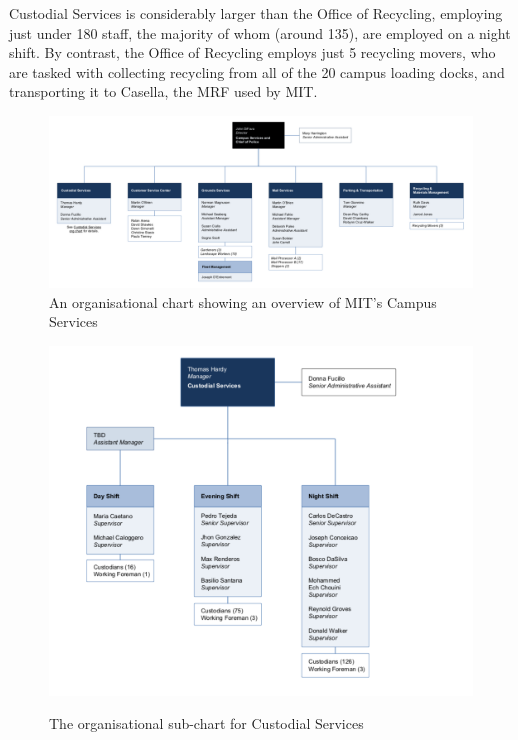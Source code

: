 \documentclass[nofonts,nols,justified,nobib]{tufte-book}
\begin{document}
Custodial Services is considerably larger than the Office of Recycling, employing just under 180 staff, the majority of whom (around 135), are employed on a night shift. By contrast, the Office of Recycling employs just 5 recycling movers, who are tasked with collecting recycling from all of the 20 campus loading docks, and transporting it to Casella, the MRF used by MIT. 

\begin{figure}
 \includegraphics[width=1\linewidth]{img/2/campus-services-overview.png}
    \caption{An organisational chart showing an overview of MIT's Campus Services}
\end{figure}

\begin{figure}
 \includegraphics[width=1\linewidth]{img/2/custodial-overview.png}
  \label{orgs}
    \caption{The organisational sub-chart for Custodial Services}
\end{figure}
\end{document}
